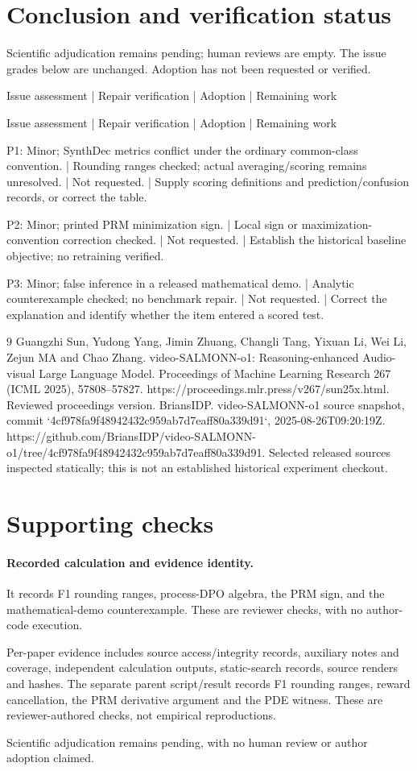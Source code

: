 \documentclass[10pt]{article}
\begin{document}
\section*{Conclusion and verification status}
Scientific adjudication remains pending; human reviews are empty. The issue grades below are unchanged. Adoption has not been requested or verified.\par
Issue assessment | Repair verification | Adoption | Remaining work\par
Issue assessment | Repair verification | Adoption | Remaining work\par
P1: Minor; SynthDec metrics conflict under the ordinary common-class convention. | Rounding ranges checked; actual averaging/scoring remains unresolved. | Not requested. | Supply scoring definitions and prediction/confusion records, or correct the table.\par
P2: Minor; printed PRM minimization sign. | Local sign or maximization-convention correction checked. | Not requested. | Establish the historical baseline objective; no retraining verified.\par
P3: Minor; false inference in a released mathematical demo. | Analytic counterexample checked; no benchmark repair. | Not requested. | Correct the explanation and identify whether the item entered a scored test.\par
9 Guangzhi Sun, Yudong Yang, Jimin Zhuang, Changli Tang, Yixuan Li, Wei Li, Zejun MA and Chao Zhang. video-SALMONN-o1: Reasoning-enhanced Audio-visual Large Language Model. Proceedings of Machine Learning Research 267 (ICML 2025), 57808–57827. https://proceedings.mlr.press/v267/sun25x.html. Reviewed proceedings version. BriansIDP. video-SALMONN-o1 source snapshot, commit `4cf978fa9f48942432c959ab7d7eaff80a339d91`, 2025-08-26T09:20:19Z. https://github.com/BriansIDP/video-SALMONN-o1/tree/4cf978fa9f48942432c959ab7d7eaff80a339d91. Selected released sources inspected statically; this is not an established historical experiment checkout.\par
\section*{Supporting checks}
\paragraph*{Recorded calculation and evidence identity.}\mbox{}\par
It records F1 rounding ranges, process-DPO algebra, the PRM sign, and the mathematical-demo counterexample. These are reviewer checks, with no author-code execution.\par
Per-paper evidence includes source access/integrity records, auxiliary notes and coverage, independent calculation outputs, static-search records, source renders and hashes. The separate parent script/result records F1 rounding ranges, reward cancellation, the PRM derivative argument and the PDE witness. These are reviewer-authored checks, not empirical reproductions.\par
Scientific adjudication remains pending, with no human review or author adoption claimed.\par
\end{document}
